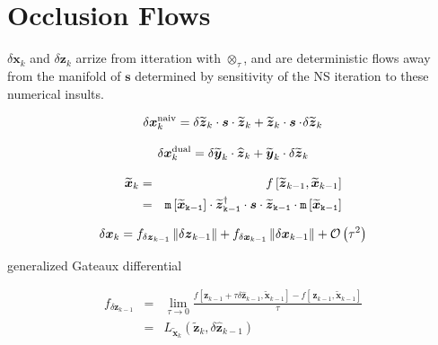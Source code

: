 \documentclass[letterpaper,twocolumn,amsmath,amsfont,amssymb,english,aps,jcp,preprintnumbers,groupaddress,nofootinbib,tightenlines]{revtex4}
\newcommand{\mat}[1]{\boldsymbol{#1}}
\newcommand{\ot}{ {\scriptstyle \otimes}_{ \tau } }
\begin{document}
\section{Occlusion Flows}

$\delta \mat{x}_k$ and $\delta \mat{z}_k$ arrize from itteration with $\ot$, and are deterministic 
flows away from the manifold of $\mat{s}$ determined by sensitivity of the NS iteration to these 
numerical insults. 


\begin{equation}
\delta \mat{x}^{\rm{naiv}}_k =   \delta  \widetilde{ \mat{z}}_{k} \cdot \mat{s} \cdot \widetilde{\mat{z}}_{k} 
                           +  \widetilde{\mat{z}}_{k} \cdot \mat{s} \cdot \! \delta \widetilde{\mat{z}}_{k} 
\end{equation}



\begin{equation}
\delta \mat{x}^{\rm{dual}}_k =   \delta  \widetilde{ \mat{y}}_{k} \cdot \widehat{\mat{z}}_{k} 
                           +  \widetilde{\mat{y}}_{k} \cdot \delta \widetilde{\mat{z}}_{k} 
\end{equation}


\begin{eqnarray}
\widetilde{\mat{x}}_k &=& f \left[\widetilde{\mat{z}}_{k-1} , \widetilde{\mat{x}}_{k-1} \right] \\ 
&=&
\tt{m} \left[ \widetilde{\mat{x}}_{k-1}\right] \cdot \widetilde{\mat{z}}^\dagger_{k-1}  
\cdot \mat{s} \cdot \widetilde{\mat{z}}_{k-1} \cdot \tt{m}\left[ \widetilde{\mat{x}}_{k-1} \right] 
\nonumber
\end{eqnarray}

\begin{equation}
\delta \mat{x}_k = {f}_{\delta \mat{z}_{k-1}}  \, \lVert \delta \mat{z}_{k-1} \rVert 
                              +  {f}_{\delta \mat{x}_{k-1}}   \, \lVert \delta \mat{x}_{k-1} \rVert 
                                                                                      + {\cal{O}} \left(  \tau^2 \right)
\end{equation}

generalized Gateaux differential

\begin{eqnarray}
f_{\delta \mat{z}_{k-1}} &=& \lim_{\tau \rightarrow 0} \frac{ f [ \mat{z}_{k-1} +\tau  \delta \widehat{\mat{z}}_{k-1}, \widetilde{\mat{x}}_{k-1} ]
-f [\, \mat{z}_{k-1}, \widetilde{\mat{x}}_{k-1} ]  }{\tau} \nonumber  \\[0.1cm] 
&=&{L}_{\widetilde{\mat{x}}_k}\left(\widetilde{\mat{z}}_{k} , \delta \widehat{\mat{z}}_{k-1} \right)  
\end{eqnarray}
\end{document}
